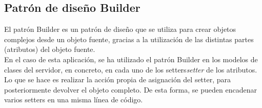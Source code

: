 \subsection{Patrón de diseño Builder}

El patrón Builder \cite{builder} es un patrón de diseño que se utiliza para crear objetos complejos desde un objeto fuente, gracias a la utilización de las distintas partes (atributos) del objeto fuente.
\\

En el caso de esta aplicación, se ha utilizado el patrón Builder en los modelos de clases del servidor, en concreto, en cada uno de los setters{\it setter} de los atributos. Lo que se hace es realizar la acción propia de asignación del setter, para posteriormente devolver el objeto completo. De esta forma, se pueden encadenar varios setters en una misma línea de código.